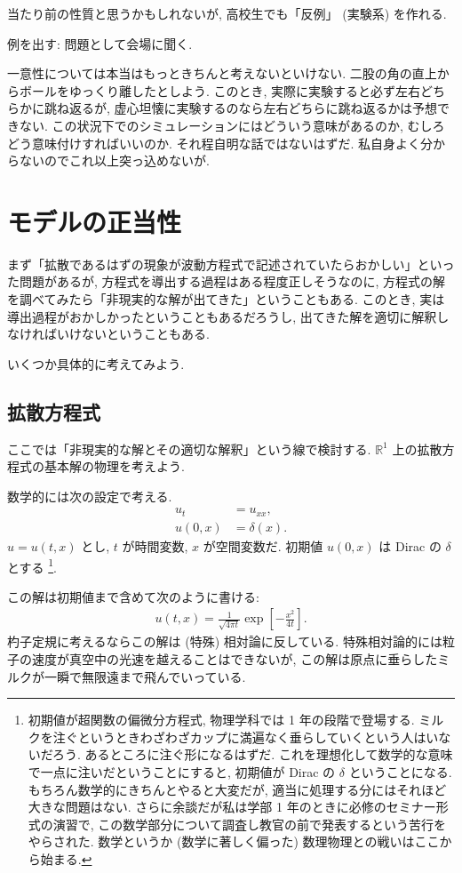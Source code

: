 \documentclass[openany, a4paper, oneside]{jsbook}
\theoremstyle{break}
\theoremstyle{breakdefn}
\begin{document}
当たり前の性質と思うかもしれないが, 高校生でも「反例」 (実験系) を作れる.

例を出す: 問題として会場に聞く.

一意性については本当はもっときちんと考えないといけない.
二股の角の直上からボールをゆっくり離したとしよう.
このとき, 実際に実験すると必ず左右どちらかに跳ね返るが, 虚心坦懐に実験するのなら左右どちらに跳ね返るかは予想できない.
この状況下でのシミュレーションにはどういう意味があるのか, むしろどう意味付けすればいいのか.
それ程自明な話ではないはずだ.
私自身よく分からないのでこれ以上突っ込めないが.
\section{モデルの正当性}


まず「拡散であるはずの現象が波動方程式で記述されていたらおかしい」といった問題があるが,
方程式を導出する過程はある程度正しそうなのに,
方程式の解を調べてみたら「非現実的な解が出てきた」ということもある.
このとき, 実は導出過程がおかしかったということもあるだろうし,
出てきた解を適切に解釈しなければいけないということもある.

いくつか具体的に考えてみよう.
\subsection{拡散方程式}


ここでは「非現実的な解とその適切な解釈」という線で検討する.
$\mathbb{R}^1$ 上の拡散方程式の基本解の物理を考えよう.

数学的には次の設定で考える.
\begin{align}
 u_t &     = u_{xx}, \\
 u (0, x) & = \delta (x).
\end{align}
$u = u (t,x)$ とし, $t$ が時間変数, $x$ が空間変数だ.
初期値 $u (0, x)$ は Dirac の $\delta$ とする \footnote{初期値が超関数の偏微分方程式, 物理学科では 1 年の段階で登場する.
ミルクを注ぐというときわざわざカップに満遍なく垂らしていくという人はいないだろう.
あるところに注ぐ形になるはずだ.
これを理想化して数学的な意味で一点に注いだということにすると,
初期値が Dirac の $\delta$ ということになる.
もちろん数学的にきちんとやると大変だが, 適当に処理する分にはそれほど大きな問題はない.
さらに余談だが私は学部 1 年のときに必修のセミナー形式の演習で,
この数学部分について調査し教官の前で発表するという苦行をやらされた.
数学というか (数学に著しく偏った) 数理物理との戦いはここから始まる.
 }.

この解は初期値まで含めて次のように書ける:
\begin{align}
 u (t, x) = \frac{1}{\sqrt{4 \pi t}} \exp \left[ - \frac{x^2}{4 t} \right].
\end{align}
杓子定規に考えるならこの解は (特殊) 相対論に反している.
特殊相対論的には粒子の速度が真空中の光速を越えることはできないが,
この解は原点に垂らしたミルクが一瞬で無限遠まで飛んでいっている.
\end{document}
